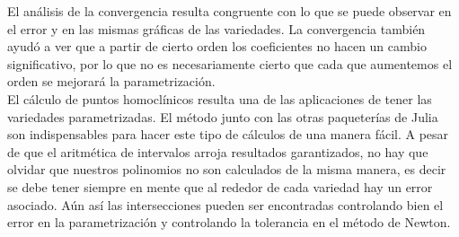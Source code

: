 El análisis de la convergencia resulta congruente con lo que se puede observar en el error y en las mismas gráficas de las variedades. La convergencia también ayudó a ver que a partir de cierto orden los coeficientes no hacen un cambio significativo, por lo que no es necesariamente cierto que cada que aumentemos el orden se mejorará la parametrización.\\


El cálculo de puntos homoclínicos resulta una de las aplicaciones de tener las variedades parametrizadas. El método junto con las otras paqueterías de Julia son indispensables para hacer este tipo de cálculos de una manera fácil. A pesar de que el aritmética de intervalos arroja resultados garantizados, no hay que olvidar que nuestros polinomios no son calculados de la misma manera, es decir se debe tener siempre en mente que al rededor de cada variedad hay un error asociado. Aún así las intersecciones pueden ser encontradas controlando bien el error en la parametrización y controlando la tolerancia en el método de Newton.






